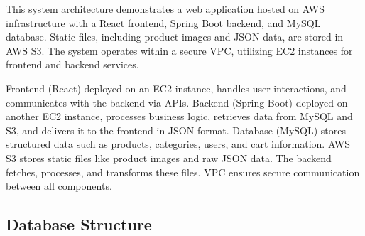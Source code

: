 \documentclass[conference]{IEEEtran}
\begin{document}
This system architecture demonstrates a web application hosted on AWS infrastructure with a React frontend, Spring Boot backend, and MySQL database. Static files, including product images and JSON data, are stored in AWS S3. The system operates within a secure VPC, utilizing EC2 instances for frontend and backend services.\newline

Frontend (React) deployed on an EC2 instance, handles user interactions, and communicates with the backend via APIs.\newline\hspace*{2.5ex}
Backend (Spring Boot) deployed on another EC2 instance, processes business logic, retrieves data from MySQL and S3, and delivers it to the frontend in JSON format.\newline\hspace*{2.5ex}
Database (MySQL) stores structured data such as products, categories, users, and cart information.
AWS S3 stores static files like product images and raw JSON data. The backend fetches, processes, and transforms these files.\newline\hspace*{2.5ex}
VPC ensures secure communication between all components.

\vspace{3cm}
\subsection{Database Structure}
\vspace{0.2cm}
\end{document}
